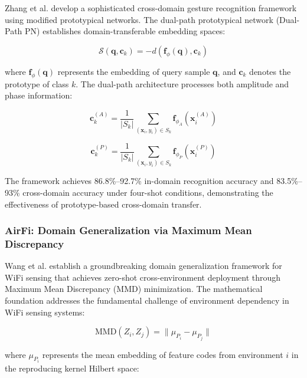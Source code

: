 \documentclass[journal]{IEEEtran}
\begin{document}
{Zhang et al. \cite{zhang2021wifi} develop a sophisticated cross-domain gesture recognition framework using modified prototypical networks. The dual-path prototypical network (Dual-Path PN) establishes domain-transferable embedding spaces:

\begin{equation}
\mathcal{S}(\mathbf{q}, \mathbf{c}_k) = -d(\mathbf{f}_{\phi}(\mathbf{q}), \mathbf{c}_k)
\label{eq:prototype_similarity}
\end{equation}

where $\mathbf{f}_{\phi}(\mathbf{q})$ represents the embedding of query sample $\mathbf{q}$, and $\mathbf{c}_k$ denotes the prototype of class $k$. The dual-path architecture processes both amplitude and phase information:

\begin{equation}
\mathbf{c}_k^{(A)} = \frac{1}{|S_k|} \sum_{(\mathbf{x}_i, y_i) \in S_k} \mathbf{f}_{\phi_A}(\mathbf{x}_i^{(A)})
\label{eq:amplitude_prototype}
\end{equation}

\begin{equation}
\mathbf{c}_k^{(P)} = \frac{1}{|S_k|} \sum_{(\mathbf{x}_i, y_i) \in S_k} \mathbf{f}_{\phi_P}(\mathbf{x}_i^{(P)})
\label{eq:phase_prototype}
\end{equation}

The framework achieves 86.8\%–92.7\% in-domain recognition accuracy and 83.5\%–93\% cross-domain accuracy under four-shot conditions, demonstrating the effectiveness of prototype-based cross-domain transfer.

\subsubsection{AirFi: Domain Generalization via Maximum Mean Discrepancy}

Wang et al. \cite{wang2022airfi} establish a groundbreaking domain generalization framework for WiFi sensing that achieves zero-shot cross-environment deployment through Maximum Mean Discrepancy (MMD) minimization. The mathematical foundation addresses the fundamental challenge of environment dependency in WiFi sensing systems:

\begin{equation}
\text{MMD}(Z_i, Z_j) = \|\mu_{P_i} - \mu_{P_j}\|
\label{eq:airfi_mmd_basic}
\end{equation}

where $\mu_{P_i}$ represents the mean embedding of feature codes from environment $i$ in the reproducing kernel Hilbert space:

}
\end{document}
